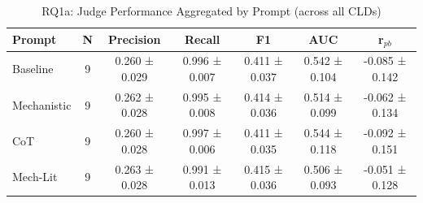 \begin{table}[htbp]
\centreing
\caption{RQ1a: Judge Performance Aggregated by Prompt (across all CLDs)}
\label{tab:rq1a_by_prompt}
\begin{tabular}{lcccccc}
\toprule
\textbf{Prompt} & \textbf{N} & \textbf{Precision} & \textbf{Recall} & \textbf{F1} & \textbf{AUC} & \textbf{r$_{pb}$} \\
\midrule
Baseline & 9 & 0.260 ± 0.029 & 0.996 ± 0.007 & 0.411 ± 0.037 & 0.542 ± 0.104 & -0.085 ± 0.142 \\
Mechanistic & 9 & 0.262 ± 0.028 & 0.995 ± 0.008 & 0.414 ± 0.036 & 0.514 ± 0.099 & -0.062 ± 0.134 \\
CoT & 9 & 0.260 ± 0.028 & 0.997 ± 0.006 & 0.411 ± 0.035 & 0.544 ± 0.118 & -0.092 ± 0.151 \\
Mech-Lit & 9 & 0.263 ± 0.028 & 0.991 ± 0.013 & 0.415 ± 0.036 & 0.506 ± 0.093 & -0.051 ± 0.128 \\
\bottomrule
\end{tabular}
\end{table}